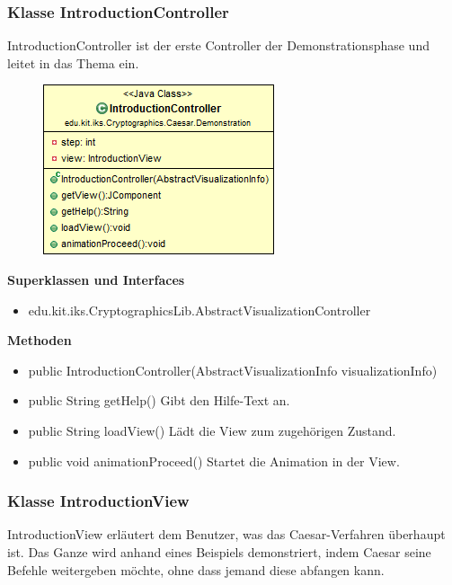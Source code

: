 \documentclass{article}
\begin{document}
\subsubsection{Klasse IntroductionController}
      IntroductionController ist der erste Controller der Demonstrationsphase und leitet in das Thema ein.

      \begin{figure}[H]
        \centering
        \includegraphics{resources/edu-kit-iks-Cryptographics-Caesar-Demonstration-IntroductionController}
      \end{figure}

      \textbf{Superklassen und Interfaces}
      \begin{itemize}
        \item edu.kit.iks.CryptographicsLib.AbstractVisualizationController
      \end{itemize}

      \textbf{Methoden}
      \begin{itemize}
        \item public IntroductionController(AbstractVisualizationInfo visualizationInfo)
        \item public String getHelp() \newline
        Gibt den Hilfe-Text an.
        \item public String loadView() \newline
        Lädt die View zum zugehörigen Zustand.
        \item public void animationProceed() \newline
        Startet die Animation in der View.
      \end{itemize}

\subsubsection{Klasse IntroductionView}
      IntroductionView erläutert dem Benutzer, was das Caesar-Verfahren überhaupt ist. Das Ganze wird
      anhand eines Beispiels demonstriert, indem Caesar seine Befehle weitergeben möchte, ohne dass jemand
      diese abfangen kann.
\end{document}
